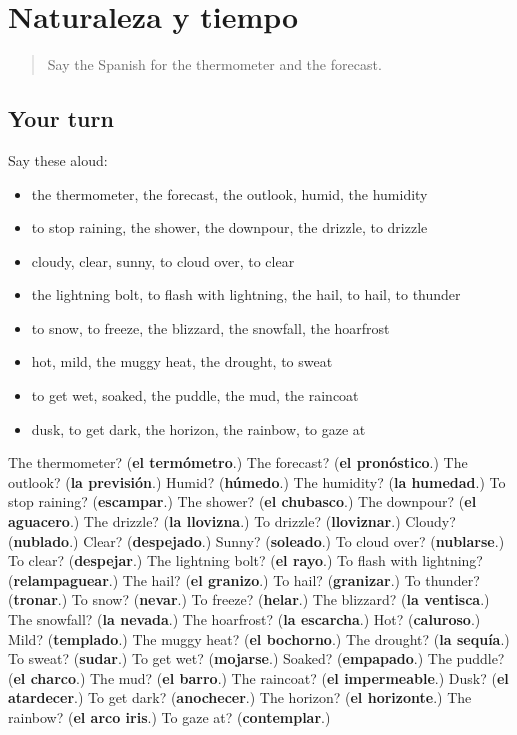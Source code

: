\section[(dialogue)]{Naturaleza y tiempo}

\label{lesson:ES-R703-repaso-696-703}



\begin{quote}
Say the Spanish for the thermometer and the forecast.
\end{quote}

\subsection*{Your turn}
Say these aloud:

\begin{itemize}
\raggedright
  \item the thermometer, the forecast, the outlook, humid, the humidity
  \item to stop raining, the shower, the downpour, the drizzle, to drizzle
  \item cloudy, clear, sunny, to cloud over, to clear
  \item the lightning bolt, to flash with lightning, the hail, to hail, to thunder
  \item to snow, to freeze, the blizzard, the snowfall, the hoarfrost
  \item hot, mild, the muggy heat, the drought, to sweat
  \item to get wet, soaked, the puddle, the mud, the raincoat
  \item dusk, to get dark, the horizon, the rainbow, to gaze at
\end{itemize}

\begin{tcolorbox}[breakable,colback=teal!4,colframe=teal!35!black,title={Before you move on}]
The thermometer? (\textbf{el termómetro}.) The forecast? (\textbf{el pronóstico}.) The outlook? (\textbf{la previsión}.) Humid? (\textbf{húmedo}.) The humidity? (\textbf{la humedad}.) To stop raining? (\textbf{escampar}.) The shower? (\textbf{el chubasco}.) The downpour? (\textbf{el aguacero}.) The drizzle? (\textbf{la llovizna}.) To drizzle? (\textbf{lloviznar}.) Cloudy? (\textbf{nublado}.) Clear? (\textbf{despejado}.) Sunny? (\textbf{soleado}.) To cloud over? (\textbf{nublarse}.) To clear? (\textbf{despejar}.) The lightning bolt? (\textbf{el rayo}.) To flash with lightning? (\textbf{relampaguear}.) The hail? (\textbf{el granizo}.) To hail? (\textbf{granizar}.) To thunder? (\textbf{tronar}.) To snow? (\textbf{nevar}.) To freeze? (\textbf{helar}.) The blizzard? (\textbf{la ventisca}.) The snowfall? (\textbf{la nevada}.) The hoarfrost? (\textbf{la escarcha}.) Hot? (\textbf{caluroso}.) Mild? (\textbf{templado}.) The muggy heat? (\textbf{el bochorno}.) The drought? (\textbf{la sequía}.) To sweat? (\textbf{sudar}.) To get wet? (\textbf{mojarse}.) Soaked? (\textbf{empapado}.) The puddle? (\textbf{el charco}.) The mud? (\textbf{el barro}.) The raincoat? (\textbf{el impermeable}.) Dusk? (\textbf{el atardecer}.) To get dark? (\textbf{anochecer}.) The horizon? (\textbf{el horizonte}.) The rainbow? (\textbf{el arco iris}.) To gaze at? (\textbf{contemplar}.)
\end{tcolorbox}
